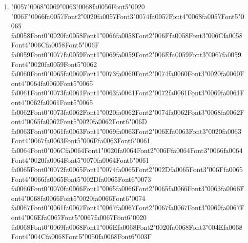 \documentclass[12pt]{article}
\begin{document}
\begin{enumerate}[label=Q\arabic*.]
\item {\char"0057}{\char"0068}{\char"0069}{\char"0063}{\char"0068}{\csname fa0056Font5\endcsname\char"0020} {\char"006F}{\char"0066}{\csname fa0057Font2\endcsname\char"0020}{\csname fa0057Font3\endcsname\char"0074}{\csname fa0057Font4\endcsname\char"0068}{\csname fa0057Font5\endcsname\char"0065} {\csname fa0058Font0\endcsname\char"0020}{\csname fa0058Font1\endcsname\char"0066}{\csname fa0058Font2\endcsname\char"006F}{\csname fa0058Font3\endcsname\char"006C}{\csname fa0058Font4\endcsname\char"006C}{\csname fa0058Font5\endcsname\char"006F} {\csname fa0059Font0\endcsname\char"0077}{\csname fa0059Font1\endcsname\char"0069}{\csname fa0059Font2\endcsname\char"006E}{\csname fa0059Font3\endcsname\char"0067}{\csname fa0059Font4\endcsname\char"0020}{\csname fa0059Font5\endcsname\char"0062} {\csname fa0060Font0\endcsname\char"0065}{\csname fa0060Font1\endcsname\char"0073}{\csname fa0060Font2\endcsname\char"0074}{\csname fa0060Font3\endcsname\char"0020}{\csname fa0060Font4\endcsname\char"0064}{\csname fa0060Font5\endcsname\char"0065} {\csname fa0061Font0\endcsname\char"0073}{\csname fa0061Font1\endcsname\char"0063}{\csname fa0061Font2\endcsname\char"0072}{\csname fa0061Font3\endcsname\char"0069}{\csname fa0061Font4\endcsname\char"0062}{\csname fa0061Font5\endcsname\char"0065} {\csname fa0062Font0\endcsname\char"0073}{\csname fa0062Font1\endcsname\char"0020}{\csname fa0062Font2\endcsname\char"0074}{\csname fa0062Font3\endcsname\char"0068}{\csname fa0062Font4\endcsname\char"0065}{\csname fa0062Font5\endcsname\char"0020}{\csname fa0062Font6\endcsname\char"006D} {\csname fa0063Font0\endcsname\char"0061}{\csname fa0063Font1\endcsname\char"0069}{\csname fa0063Font2\endcsname\char"006E}{\csname fa0063Font3\endcsname\char"0020}{\csname fa0063Font4\endcsname\char"0067}{\csname fa0063Font5\endcsname\char"006F}{\csname fa0063Font6\endcsname\char"0061} {\csname fa0064Font0\endcsname\char"006C}{\csname fa0064Font1\endcsname\char"0020}{\csname fa0064Font2\endcsname\char"006F}{\csname fa0064Font3\endcsname\char"0066}{\csname fa0064Font4\endcsname\char"0020}{\csname fa0064Font5\endcsname\char"0070}{\csname fa0064Font6\endcsname\char"0061} {\csname fa0065Font0\endcsname\char"0072}{\csname fa0065Font1\endcsname\char"0074}{\csname fa0065Font2\endcsname\char"002D}{\csname fa0065Font3\endcsname\char"006F}{\csname fa0065Font4\endcsname\char"0066}{\csname fa0065Font5\endcsname\char"002D}{\csname fa0065Font6\endcsname\char"0073} {\csname fa0066Font0\endcsname\char"0070}{\csname fa0066Font1\endcsname\char"0065}{\csname fa0066Font2\endcsname\char"0065}{\csname fa0066Font3\endcsname\char"0063}{\csname fa0066Font4\endcsname\char"0068}{\csname fa0066Font5\endcsname\char"0020}{\csname fa0066Font6\endcsname\char"0074} {\csname fa0067Font0\endcsname\char"0061}{\csname fa0067Font1\endcsname\char"0067}{\csname fa0067Font2\endcsname\char"0067}{\csname fa0067Font3\endcsname\char"0069}{\csname fa0067Font4\endcsname\char"006E}{\csname fa0067Font5\endcsname\char"0067}{\csname fa0067Font6\endcsname\char"0020} {\csname fa0068Font0\endcsname\char"0069}{\csname fa0068Font1\endcsname\char"006E}{\csname fa0068Font2\endcsname\char"0020}{\csname fa0068Font3\endcsname\char"004E}{\csname fa0068Font4\endcsname\char"004C}{\csname fa0068Font5\endcsname\char"0050}{\csname fa0068Font6\endcsname\char"003F}

\end{enumerate}
\end{document}
